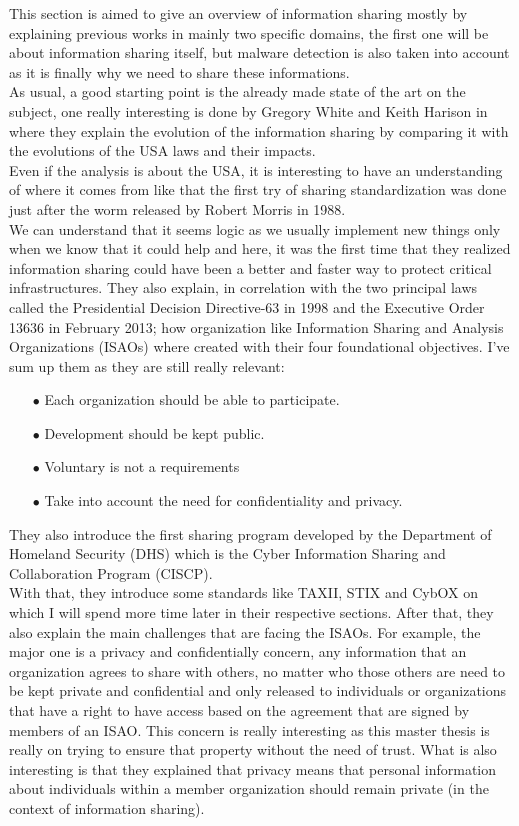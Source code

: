 \documentclass{eplmastersthesis}
\begin{document}
This section is aimed to give an overview of information sharing mostly by explaining previous works in mainly two specific domains, the first one will be about information sharing itself, but malware detection is also taken into account as it is finally why we need to share these informations.\\
As usual, a good starting point is the already made state of the art on the subject, one really interesting is done by Gregory White and Keith Harison in \cite{white2017state} where they explain the evolution of the information sharing by comparing it with the evolutions of the USA laws and their impacts.\\
Even if the analysis is about the USA, it is interesting to have an understanding of where it comes from like that the first try of sharing standardization was done just after the worm released by Robert Morris in 1988.\\
We can understand that it seems logic as we usually implement new things only when we know that it could help and here, it was the first time that they realized information sharing could have been a better and faster way to protect critical infrastructures. They also explain, in correlation with the two principal laws called the Presidential Decision Directive-63 in 1998 and the Executive Order 13636 in February 2013; how organization like Information Sharing and Analysis Organizations (ISAOs) where created with their four foundational objectives. I've sum up them as they are still really relevant:
\begin{itemize}
\item[$\bullet$] Each organization should be able to participate.
\item[$\bullet$] Development should be kept public.
\item[$\bullet$] Voluntary is not a requirements 
\item[$\bullet$] Take into account the need for confidentiality and privacy.
\end{itemize}
They also introduce the first sharing program developed by the Department of Homeland Security (DHS) which is the Cyber Information Sharing and Collaboration Program (CISCP).\\
With that, they introduce some standards like TAXII, STIX and CybOX on which I will spend more time later in their respective sections. After that, they also explain the main challenges that are facing the ISAOs. For example, the major one is a privacy and confidentially concern, any information that an organization agrees to share with others, no matter who those others are need to be kept private and confidential and only released to individuals or organizations that have a right to have access based on the agreement that are signed by members of an ISAO. This concern is really interesting as this master thesis is really on trying to ensure that property without the need of trust. What is also interesting is that they explained that privacy means that personal information about individuals within a member organization should remain private (in the context of information sharing).
\end{document}
